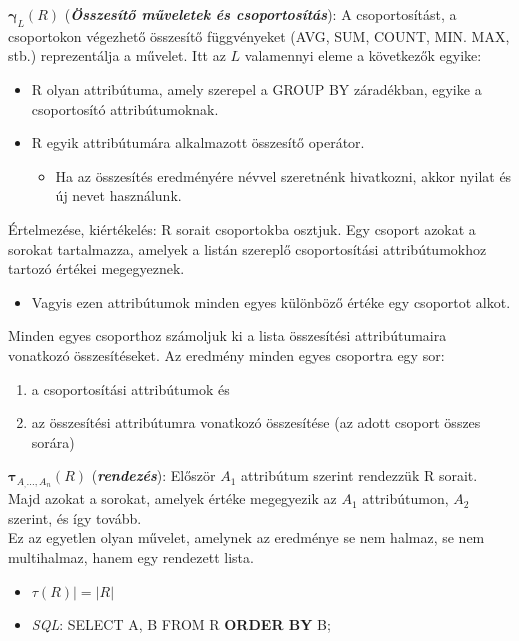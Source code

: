 \documentclass[tikz,12pt,margin=0px]{article}
\begin{document}
        \noindent $\boldsymbol{\gamma}_{L}(R)$ (\textbf{\emph{Összesítő műveletek és csoportosítás}}): A csoportosítást, a csoportokon végezhető összesítő függvényeket (AVG, SUM, COUNT, MIN. MAX, stb.) reprezentálja a művelet.
        \noindent Itt az $L$ valamennyi eleme a következők egyike:
		\begin{itemize}
			\item R olyan attribútuma, amely szerepel a GROUP BY záradékban, egyike a csoportosító attribútumoknak.
			\item R egyik attribútumára alkalmazott összesítő operátor.
            \begin{itemize}
                \item Ha az összesítés eredményére névvel szeretnénk hivatkozni, akkor nyilat és új nevet használunk.
            \end{itemize}
		\end{itemize}
        \noindent Értelmezése, kiértékelés: R sorait csoportokba osztjuk. Egy csoport azokat a sorokat tartalmazza, amelyek a listán szereplő csoportosítási attribútumokhoz tartozó értékei megegyeznek.
        \begin{itemize}
            \item Vagyis ezen attribútumok minden egyes különböző értéke egy csoportot alkot.
        \end{itemize}
        Minden egyes csoporthoz számoljuk ki a lista összesítési attribútumaira vonatkozó összesítéseket. Az eredmény minden egyes csoportra egy sor:
		\begin{enumerate}
			\item a csoportosítási attribútumok és
			\item az összesítési attribútumra vonatkozó összesítése	(az adott csoport összes sorára)
		\end{enumerate}

    \noindent $\boldsymbol{\tau}_{A_, \ldots, A_n}(R)$ (\textbf{\emph{rendezés}}): Először $A_1$ attribútum szerint rendezzük R sorait. Majd azokat a sorokat, amelyek értéke megegyezik az $A_1$ attribútumon, $A_2$ szerint, és így tovább. \\
	Ez az egyetlen olyan művelet, amelynek az eredménye se nem halmaz, se nem multihalmaz, hanem egy rendezett lista.
    \begin{itemize}
        \item $\tau(R)| = \Big|R\Big|$
        \item \emph{SQL}: SELECT A, B FROM R \textbf{ORDER BY} B;\\
    \end{itemize}
\end{document}

